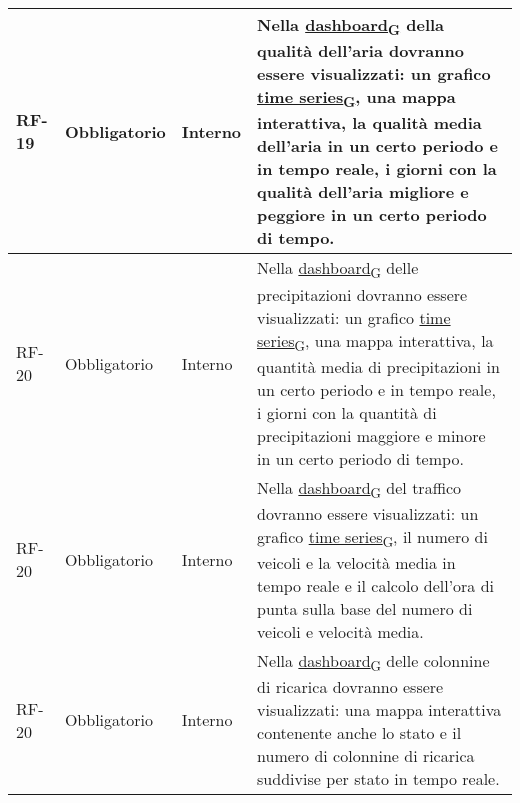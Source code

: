 \begin{longtable}{|>{\centering\arraybackslash}m{}|>{\centering\arraybackslash}m{}|>{\centering\arraybackslash}m{}|>{\centering\arraybackslash}m{}|}
	RF-19           & Obbligatorio        & Interno                                                                                                           & Nella \href{https://7last.github.io/docs/rtb/documentazione-interna/glossario\#dashboard}{dashboard\textsubscript{G}} della qualità dell'aria dovranno essere visualizzati: un grafico \href{https://7last.github.io/docs/rtb/documentazione-interna/glossario\#time-series}{time series\textsubscript{G}}, una mappa interattiva, la qualità media dell'aria in un certo periodo e in tempo reale, i giorni con la qualità dell'aria migliore e peggiore in un certo periodo di tempo.              \\\hline
	RF-20           & Obbligatorio        & Interno                                                                                                           & Nella \href{https://7last.github.io/docs/rtb/documentazione-interna/glossario\#dashboard}{dashboard\textsubscript{G}} delle precipitazioni dovranno essere visualizzati: un grafico \href{https://7last.github.io/docs/rtb/documentazione-interna/glossario\#time-series}{time series\textsubscript{G}}, una mappa interattiva, la quantità media di precipitazioni in un certo periodo e in tempo reale, i giorni con la quantità di precipitazioni maggiore e minore in un certo periodo di tempo. \\\hline
	RF-20           & Obbligatorio        & Interno                                                                                                           & Nella \href{https://7last.github.io/docs/rtb/documentazione-interna/glossario\#dashboard}{dashboard\textsubscript{G}} del traffico dovranno essere visualizzati: un grafico \href{https://7last.github.io/docs/rtb/documentazione-interna/glossario\#time-series}{time series\textsubscript{G}}, il numero di veicoli e la velocità media in tempo reale e il calcolo dell'ora di punta sulla base del numero di veicoli e velocità media.                                                           \\\hline
	RF-20           & Obbligatorio        & Interno                                                                                                           & Nella \href{https://7last.github.io/docs/rtb/documentazione-interna/glossario\#dashboard}{dashboard\textsubscript{G}} delle colonnine di ricarica dovranno essere visualizzati: una mappa interattiva contenente anche lo stato e il numero di colonnine di ricarica suddivise per stato in tempo reale.                                                                                                                                                                                             \\\hline

\end{longtable}
